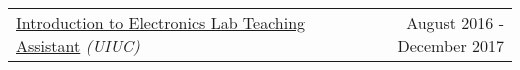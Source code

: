 \documentclass[10pt, letterpaper]{article}
\makeatletter
\newcommand{\headerrow}[2]
{\begin{tabular*}{\linewidth}{l@{\extracolsep{\fill}}r}
	#1 &
	#2 \\
\end{tabular*}}
\makeatother
\begin{document}
\headerrow
	{\uline{Introduction to Electronics Lab Teaching Assistant} \textit{(UIUC)}}
	{August 2016 - December 2017}
	\begin{comment}
	\begin{itemize}
		\item Led basic electronics lab sessions weekly and graded lab reports weekly
	\end{itemize}
	\end{comment}
	\newline %

	\begin{comment}
\headerrow
	{\uline{Introduction to Circuits and Electronics Lecture Assistant} \textit{(UMN)}}
	{January 2016 - May 2016}
	\begin{itemize}
		\item Held weekly office hours to help students learn the basics of circuits and electronics and graded exams
	\end{itemize}


\headerrow
	{\uline{Introduction to Digital System Design Lecture Assistant} \textit{(UMN)}}
	{September 2015 - December 2015}
	\begin{itemize}
		\item Held weekly office hours to assit students with learning the basics of digital system design and graded homeworks and exams%
	\end{itemize}

\headerrow
	{\uline{Commercial Electrical Engineering Intern} \textit{(The Toro Company)}}
	{May 2015 - August 2015}
	\begin{itemize}
		\item Investigated warranty claims on field-return control boards to determine possible failure modes and the statistics of the failure rates
		\item Designed prototype wireless test platforms, including a GPS and Bluetooth-based asset tracker and a wireless joystick control platform
		\item Investigated the internal components and safety ratings for high-current, three-phase AC motor contorllers for comparison against the various vendor ratings, to provide a final recommendation for use in the fully electric mid-duty Toro Workman
	\end{itemize}

\headerrow
	{\uline{Taylor Center Tutor} \textit{(UMN)}}
	{September 2013 - December 2014}
	\begin{itemize}	
		\item Tutored freshmen in Physics I \& II, Calculus I, II, \& III, and Linear Algebra at Frontier Residence Hall
	\end{itemize}

\end{comment}
\end{document}
